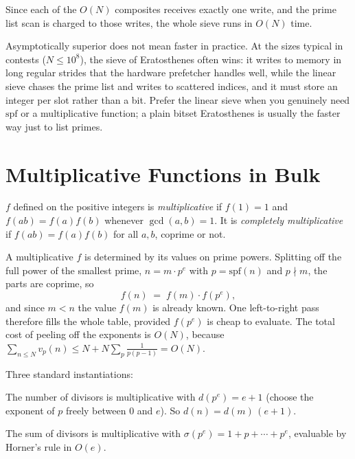 \documentclass[11pt]{article}
\begin{document}
Since each of the $O(N)$ composites receives exactly one write, and the prime
list scan is charged to those writes, the whole sieve runs in $O(N)$ time.

\begin{notebox}
Asymptotically superior does not mean faster in practice. At the sizes typical
in contests ($N \le 10^8$), the sieve of Eratosthenes often wins: it writes to
memory in long regular strides that the hardware prefetcher handles well,
while the linear sieve chases the prime list and writes to scattered indices,
and it must store an integer per slot rather than a bit. Prefer the linear
sieve when you genuinely need $\mathrm{spf}$ or a multiplicative function; a
plain bitset Eratosthenes is usually the faster way just to list primes.
\end{notebox}

\section{Multiplicative Functions in Bulk}

\begin{definitionbox}
$f$ defined on the positive integers is \emph{multiplicative} if $f(1) = 1$ and
$f(ab) = f(a)f(b)$ whenever $\gcd(a, b) = 1$. It is \emph{completely
multiplicative} if $f(ab) = f(a)f(b)$ for all $a, b$, coprime or not.
\end{definitionbox}

A multiplicative $f$ is determined by its values on prime powers. Splitting off
the full power of the smallest prime, $n = m \cdot p^{e}$ with
$p = \mathrm{spf}(n)$ and $p \nmid m$, the parts are coprime, so
\[
  f(n) \;=\; f(m) \cdot f(p^{e}),
\]
and since $m < n$ the value $f(m)$ is already known. One left-to-right pass
therefore fills the whole table, provided $f(p^e)$ is cheap to evaluate. The
total cost of peeling off the exponents is $O(N)$, because
$\sum_{n \le N} v_p(n) \le N + N\sum_p \frac{1}{p(p-1)} = O(N)$.

Three standard instantiations:

\begin{examplebox}
The number of divisors is multiplicative with $d(p^e) = e + 1$ (choose the
exponent of $p$ freely between $0$ and $e$). So $d(n) = d(m)\,(e+1)$.
\end{examplebox}

\begin{examplebox}
The sum of divisors is multiplicative with
$\sigma(p^e) = 1 + p + \cdots + p^{e}$, evaluable by Horner's rule in $O(e)$.
\end{examplebox}
\end{document}
